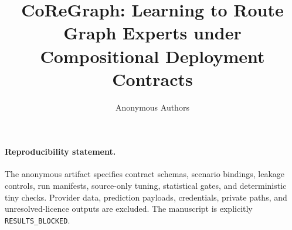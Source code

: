 \documentclass{article}
\title{CoReGraph: Learning to Route Graph Experts under Compositional Deployment Contracts}
\author{Anonymous Authors}
\begin{document}
\maketitle














\paragraph{Reproducibility statement.}
The anonymous artifact specifies contract schemas, scenario bindings, leakage controls, run manifests, source-only tuning, statistical gates, and deterministic tiny checks. Provider data, prediction payloads, credentials, private paths, and unresolved-licence outputs are excluded. The manuscript is explicitly \texttt{RESULTS\_BLOCKED}.



\end{document}
